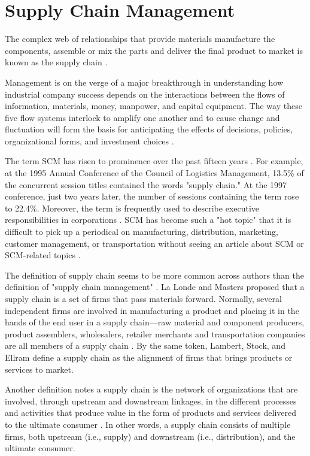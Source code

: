 \section{Supply Chain Management}\label{sec:scm}

The complex web of relationships that provide materials manufacture the components, assemble or mix the parts and deliver the final product to market is known as the supply chain \cite{buurman2002supply}.

Management is on the verge of a major breakthrough in understanding how industrial company success depends on the interactions between the flows of information, materials, money, manpower, and capital equipment. The way these five flow systems interlock to amplify one another and to cause change and fluctuation will form the basis for anticipating the effects of decisions, policies, organizational forms, and investment choices \cite{forrester1958industrial}.

The term \ac{SCM} has risen to prominence over the past fifteen years \cite{cooper1997supply}. For example, at the 1995 Annual Conference of the Council of Logistics Management, 13.5\% of the concurrent session titles contained the words "supply chain." At the 1997 conference, just two years later, the number of sessions containing the term rose to 22.4\%. Moreover, the term is frequently used to describe executive responsibilities in corporations \cite{la1997supply}. SCM has become such a "hot topic" that it is difficult to pick up a periodical on manufacturing, distribution, marketing, customer management, or transportation without seeing an article about SCM or SCM-related topics \cite{ross1997competing}.

The definition of supply chain seems to be more common across authors than the definition of "supply chain management" \cite{cooper1993characteristics, la1994emerging, lambert1998fundamentals}. La Londe and Masters proposed that a supply chain is a set of firms that pass materials forward. Normally, several independent firms are involved in manufacturing a product and placing it in the hands of the end user in a supply chain—raw material and component producers, product assemblers, wholesalers, retailer merchants and transportation companies are all members of a supply chain \cite{la1994emerging}. By the same token, Lambert, Stock, and Ellram define a supply chain as the alignment of firms that brings products or services to market. 

Another definition notes a supply chain is the network of organizations that are involved, through upstream and downstream linkages, in the different processes and activities that produce value in the form of products and services delivered to the ultimate consumer \cite{christopher2017logistics}. In other words, a supply chain consists of multiple firms, both upstream (i.e., supply) and downstream
(i.e., distribution), and the ultimate consumer. 

